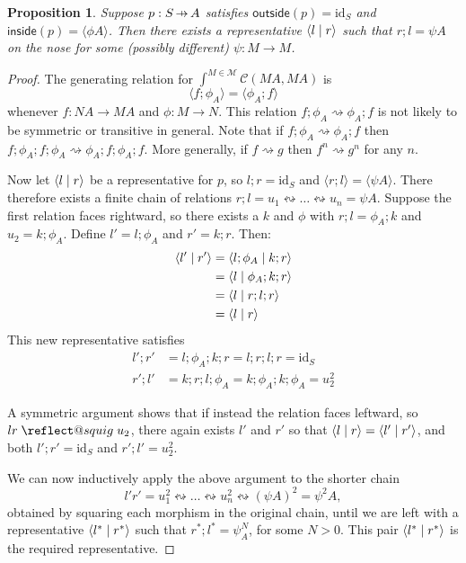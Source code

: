 \documentclass[11pt,letterpaper]{article}
\makeatletter
\theoremstyle{plain}
\newtheorem{proposition}[theorem]{Proposition}
\theoremstyle{definition}
\newcommand{\C}{\mathscr{C}}
\newcommand{\M}{\mathscr{M}}
\newcommand{\id}{\mathrm{id}}
\newcommand{\rep}[2]{{\ensuremath \left\langle #1 \mid #2 \right\rangle}}
\newcommand{\inside}{\mathsf{inside}}
\newcommand{\outside}{\mathsf{outside}}
\newcommand{\hto}{\ensuremath{\,\mathaccent\shortmid\rightarrow\,}}
\providecommand{\leftsquigarrow}{%
  \mathrel{\mathpalette\reflect@squig\relax}%
}
\newcommand{\reflect@squig}[2]{%
  \reflectbox{$\m@th#1\rightsquigarrow$}%
}
\makeatother
\begin{document}
\begin{proposition}\label{prop:onthenose}
  Suppose $p : S \hto A$ satisfies $\outside(p) = \id_S$ and $\inside(p) = \langle \phi A \rangle$. Then there exists a representative $\rep{l}{r}$ such that $r;l = \psi A$ on the nose for some (possibly different) $\psi : M \to M$.
\end{proposition}
\begin{proof}
  The generating relation for $\int^{M \in \M} \C(M A, M A)$ is
  \[ \langle f; \phi_A \rangle = \langle \phi_A; f \rangle \]
  whenever $f : N A \to M A$ and $\phi : M \to N$. This relation $f; \phi_A \rightsquigarrow \phi_A; f$ is not likely to be symmetric or transitive in general. Note that if $f; \phi_A \rightsquigarrow \phi_A; f$ then $f ;\phi_A ;f; \phi_A \rightsquigarrow \phi_A ;f ;\phi_A; f$. More generally, if $f \rightsquigarrow g$ then $f^n \rightsquigarrow g^n$ for any $n$.

  Now let $\rep{l}{r}$ be a representative for $p$, so $l;r = \id_S$ and $\langle r;l \rangle = \langle \psi A\rangle$. There therefore exists a finite chain of relations $r;l = u_1 \leftrightsquigarrow \dots \leftrightsquigarrow u_n = \psi A$. Suppose the first relation faces rightward, so there exists a $k$ and $\phi$ with $r;l = \phi_A;k$ and $u_2 = k;\phi_A$. Define $l' = l;\phi_A$ and $r' = k;r$. Then:
\begin{align*}
\rep{l'}{r'}
&= \rep{l ; \phi_A}{k ; r} \\
&= \rep{l}{\phi_A ; k ; r} \\
&= \rep{l}{r ; l; r} \\
&= \rep{l}{r}
\end{align*}
This new representative satisfies
\begin{align*}
l';r' &= l;\phi_A;k;r = l;r;l;r = \id_S \\
r';l' &= k;r;l;\phi_A = k;\phi_A;k;\phi_A = u_2^2
\end{align*}

  A symmetric argument shows that if instead the relation faces leftward, so $lr \leftsquigarrow u_2$, there again exists $l'$ and $r'$ so that $\rep{l}{r} = \rep{l'}{r'}$, and both $l';r' = \id_S$ and $r';l' = u_2^2$.

  We can now inductively apply the above argument to the shorter chain \[l'r' = u_1^2 \leftrightsquigarrow \dots \leftrightsquigarrow u_n^2 \leftrightsquigarrow {(\psi A)}^2 = \psi^2 A,\] obtained by squaring each morphism in the original chain, until we are left with a representative $\rep{l^*}{r^*}$ such that $r^*;l^* = \psi^N_A$, for some $N>0$. This pair $\rep{l^*}{r^*}$ is the required representative.
\end{proof}
\end{document}
